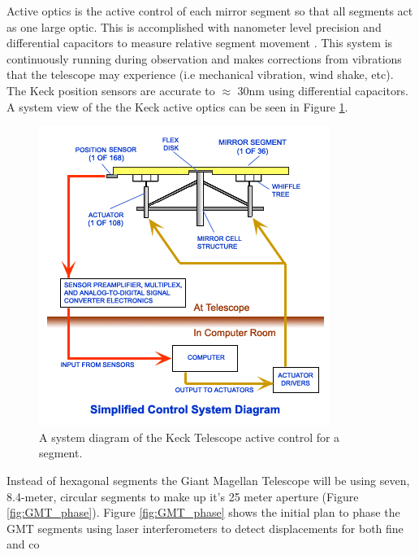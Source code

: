 Active optics is the active control of each mirror segment so that all segments act as one large optic.  This is accomplished with nanometer level precision and differential capacitors to measure relative segment movement \cite{Nelson1990titleConstructionObservatory/title}.  This system is continuously running during observation and makes corrections from vibrations that the telescope may experience (i.e mechanical vibration, wind shake, etc).  The Keck position sensors are accurate to $\approx$ 30nm using differential capacitors.  A system view of the the Keck active optics can be seen in Figure \ref{fig:active_control}.


\begin{figure}[H]
\centering
\includegraphics[width=12 cm]{../Figures/KCompDiag}
\caption{A system diagram of the Keck Telescope active control for a segment.}
\label{fig:active_control}
\end{figure}

Instead of hexagonal segments the Giant Magellan Telescope will be using seven, 8.4-meter, circular segments to make up it's 25 meter aperture (Figure \ref{fig:GMT_phase}).  Figure \ref{fig:GMT_phase} shows the initial plan to phase the GMT segments using laser interferometers to detect displacements for both fine and co


